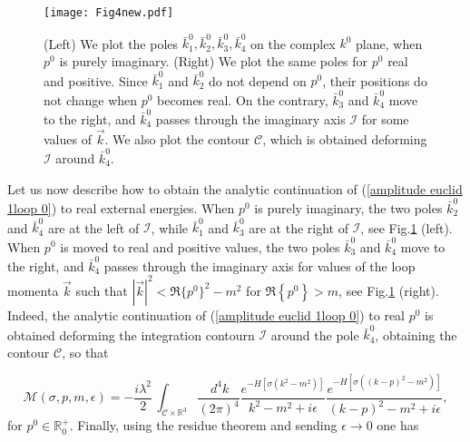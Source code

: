 \documentclass[a4paper,11pt]{article}
\begin{document}
\begin{figure}
	\begin{center}
		\hspace{-1cm}
		\texttt{[image: Fig4new.pdf]}
	\end{center}
\caption{(Left) We plot the poles $\bar{k}^0_1, \bar{k}^0_2,\bar{k}^0_3,\bar{k}^0_4$ on the complex $k^0$ plane,  when $p^0$ is purely imaginary. (Right) We plot the same poles for $p^0$ real and positive. Since $\bar{k}^0_1$ and $\bar{k}^0_2$ do not depend on $p^0$, their positions do not change when $p^0$ becomes real. On the contrary, $\bar{k}^0_3$ and $\bar{k}^0_4$ move to the right, and $\bar{k}^0_4$ passes through the imaginary axis $\mathcal{I}$ for some values of $\vec{k}$. We also plot the contour $\mathcal{C}$, which is obtained deforming $\mathcal{I}$ around $\bar{k}^0_4$.}	\label{Fig3old}
\end{figure}






Let us now describe how to obtain the analytic continuation of (\ref{amplitude euclid 1loop 0}) to real external energies. When $p^0$ is purely
imaginary, the two poles $\bar{k}^0_{2}$ and $\bar{k}^0_{4}$ are  at
the left of $\mathcal{I}$, while $\bar{k}^0_{1}$ and $\bar{k}^0_{3}$ are  at the right of $\mathcal{I}$, see Fig.\ref{Fig3old} (left). When $p^0$ is moved to real and positive values, the two poles $\bar{k}^0_{3}$ and $\bar{k}^0_{4}$ move to the right, and 
$\bar{k}^0_{4}$ passes through the imaginary axis for  values of the loop momenta $\vec{k}$ such that $|\vec{k}|^2< \Re\{p^0\}^2-m^2$ for $\Re\left\{p^0\right\}> m$, see Fig.\ref{Fig3old} (right).
Indeed, the analytic continuation of (\ref{amplitude euclid 1loop 0}) to real $p^0$ is obtained deforming the integration contourn $\mathcal{I}$ around the pole $\bar{k}^0_{4}$, obtaining the contour $\mathcal{C}$, so that

\begin{equation}\label{amplitude euclid 1loop 1}
\mathcal{M}(\sigma,p,m,\epsilon) = -  \frac{i \lambda^2}{2} \, \int_{
	\mathcal{C} \times	\mathbb{R}^3} \frac{ \, d^4 k}{(2\pi)^4}
\frac{e^{-H\left[\sigma\left(k^2-m^2\right)\right]}}{k^2 - m^2 + i \epsilon} \frac{e^{-H\left[\sigma\left(\left(k-p\right)^2-m^2\right)\right]}}{(k-p)^2 - m^2 + i \epsilon} ,
\end{equation}
for $p^0 \in \mathbb{R}^+_0$. Finally, using the residue theorem and sending $\epsilon\rightarrow 0$ one has 
\end{document}
